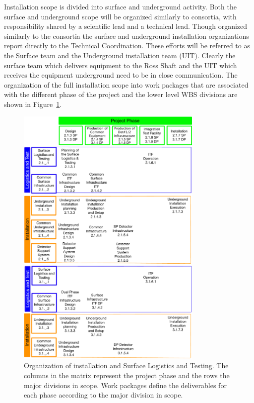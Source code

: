 Installation scope is divided into surface and underground
activity. Both the surface and underground scope will be organized
similarly to consortia, with responsibility shared by a scientific
lead and a technical lead. Though organized similarly to the consortia
the surface and underground installation organizations report directly
to the Technical Coordination. These efforts will be referred to as
the Surface team and the Underground installation team (UIT). Clearly
the surface team which delivers equipment to the Ross Shaft and the
UIT which receives the equipment underground need to be in close
communication. The organization of the full installation scope into
work packages that are associated with the different phase of the
project and the lower level WBS divisions are shown in
Figure~\ref{WP_def}.
\begin{figure}[!h]
  \begin{center}
    \includegraphics[width=0.8\textwidth]{far-detector-single-phase/figures/OrgChart-v3.pdf}
    \caption{Organization of installation and Surface Logistics and
      Testing. The columns in the matrix represent the project phase
      and the rows the major divisions in scope. Work packages define
      the deliverables for each phase according to the major division
      in scope. }
    \label{WP_def}
  \end{center}
\end{figure}
